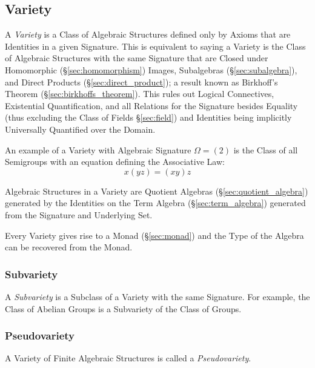 \subsection{Variety}\label{sec:variety}

A \emph{Variety} is a Class of Algebraic Structures defined only by
Axioms that are Identities in a given Signature. This is equivalent to
saying a Variety is the Class of Algebraic Structures with the same
Signature that are Closed under Homomorphic (\S\ref{sec:homomorphism})
Images, Subalgebras (\S\ref{sec:subalgebra}), and Direct Products
(\S\ref{sec:direct_product}); a result known as Birkhoff's Theorem
(\S\ref{sec:birkhoffs_theorem}). This rules out Logical Connectives,
Existential Quantification, and all Relations for the Signature
besides Equality (thus excluding the Class of Fields
\S\ref{sec:field}) and Identities being implicitly Universally
Quantified over the Domain.

An example of a Variety with Algebraic Signature $\Omega = (2)$ is the
Class of all Semigroups with an equation defining the Associative Law:
\[
    x(yz) = (xy)z
\]

Algebraic Structures in a Variety are Quotient Algebras
(\S\ref{sec:quotient_algebra}) generated by the Identities on the Term
Algebra (\S\ref{sec:term_algebra}) generated from the Signature and
Underlying Set.

Every Variety gives rise to a Monad (\S\ref{sec:monad}) and the Type
of the Algebra can be recovered from the Monad.



\subsubsection{Subvariety}\label{sec:subvariety_theorem}

A \emph{Subvariety} is a Subclass of a Variety with the same
Signature. For example, the Class of Abelian Groups is a Subvariety of
the Class of Groups.



\subsubsection{Pseudovariety}\label{sec:pseudovariety}

A Variety of Finite Algebraic Structures is called a
\emph{Pseudovariety}.



